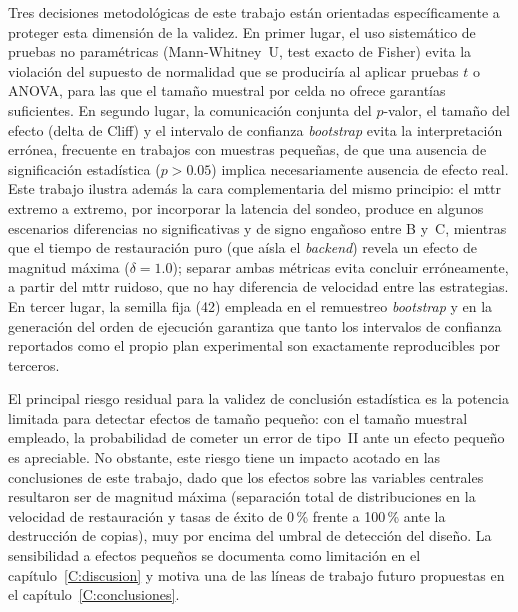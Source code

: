 \documentclass[../main.tex]{subfiles}
\begin{document}
Tres decisiones metodológicas de este trabajo están orientadas específicamente a
proteger esta dimensión de la validez. En primer lugar, el uso sistemático de
pruebas no paramétricas (Mann-Whitney~U, test exacto de Fisher) evita la
violación del supuesto de normalidad que se produciría al aplicar pruebas $t$ o
ANOVA, para las que el tamaño muestral por celda no ofrece garantías suficientes.
En segundo lugar, la comunicación conjunta del $p$-valor, el tamaño del efecto
(delta de Cliff) y el intervalo de confianza \emph{bootstrap} evita la
interpretación errónea, frecuente en trabajos con muestras pequeñas, de que una
ausencia de significación estadística ($p > 0.05$) implica necesariamente ausencia
de efecto real. Este trabajo ilustra además la cara complementaria del mismo
principio: el \gls{mttr} extremo a extremo, por incorporar la latencia del sondeo,
produce en algunos escenarios diferencias no significativas y de signo engañoso
entre B y~C, mientras que el tiempo de restauración puro (que aísla el
\emph{backend}) revela un efecto de magnitud máxima ($\delta = 1.0$); separar
ambas métricas evita concluir erróneamente, a partir del \gls{mttr} ruidoso, que no
hay diferencia de velocidad entre las estrategias. En tercer lugar, la semilla fija
(42) empleada en el remuestreo \emph{bootstrap} y en la generación del orden de
ejecución garantiza que tanto los intervalos de confianza reportados como el propio
plan experimental son exactamente reproducibles por terceros.

El principal riesgo residual para la validez de conclusión estadística es la
potencia limitada para detectar efectos de tamaño pequeño: con el tamaño muestral
empleado, la probabilidad de cometer un error de tipo~II ante un efecto pequeño es
apreciable. No obstante, este riesgo tiene un impacto acotado en las conclusiones
de este trabajo, dado que los efectos sobre las variables centrales resultaron ser
de magnitud máxima (separación total de distribuciones en la velocidad de
restauración y tasas de éxito de 0\,\% frente a 100\,\% ante la destrucción de
copias), muy por encima del umbral de detección del diseño. La sensibilidad a
efectos pequeños se documenta como limitación en el capítulo~\ref{C:discusion} y
motiva una de las líneas de trabajo futuro propuestas en el
capítulo~\ref{C:conclusiones}.
\end{document}

